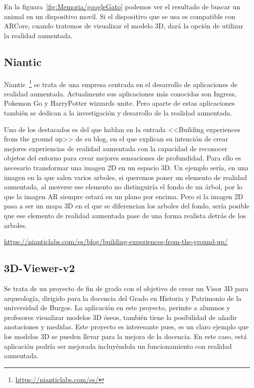 En la figuara~\ref{fig:Memoria/googleGato} podemos ver el resultado de buscar un animal en un dispositivo movil. Si el dispositivo que se usa es compatible con ARCore, cuando tratemos de visualizar el modelo 3D, dará la opción de utilizar la realidad aumentada.


\subsection{Niantic}
Niantic~\footnote{\url{https://nianticlabs.com/es/}} se trata de una empresa centrada en el desarrollo de aplicaciones de realidad aumentada. Actualmente sus aplicaciones más conocidas son Ingress, Pokemon Go y HarryPotter wizzards unite.
Pero aparte de estas aplicaciones también se dedican a la investigación y desarrollo de la realidad aumentada.

Uno de los destacados es del que hablan en la entrada <<Building experiences from the ground up>> de su blog, en el que explican su intención de crear mejores experiencias de realidad aumentada con
la capacidad de reconocer objetos del entorno para crear mejores sensaciones de profundidad. Para ello es necesario transformar una imagen 2D en un espacio 3D. Un ejemplo sería, en una imagen en la que salen varios arboles, si queremos poner un elemento de realidad aumentada, al moverse ese elemento no distinguiría el fondo de un árbol, por lo que la imagen AR siempre estará en un plano por encima. Pero si la imagen 2D pasa a ser un mapa 3D en el que se diferencian los arboles del fondo, sería posible que ese elemento de realidad aumentada pase de una forma realista detrás de los arboles. 

\url{https://nianticlabs.com/es/blog/building-experiences-from-the-ground-up/}



\subsection{3D-Viewer-v2}

Se trata de un proyecto de fin de grado con el objetivo de crear un Visor 3D para arqueología, dirigido para la docencia del Grado en Historia y Patrimonio de la universidad de Burgos.
La aplicación en este proyecto, perimte a alumnos y profesores visualizar modelos 3D óseos, también tiene la posibilidad de añadir anotaciones y medidas. Este proyecto es interesante pues, es un claro ejemplo que los modelos 3D se pueden llevar para la mejora de la docencia. En este caso, está aplicación podría ser mejorada incluyéndola un funcionamiento con realidad aumentada.


